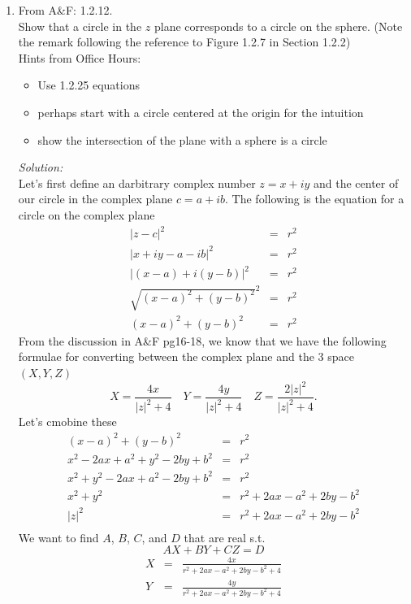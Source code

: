 \documentclass[10pt]{amsart}
\theoremstyle{nonumberplain}
\begin{document}
\mline
\begin{enumerate}[label={\bf {\arabic*}:}]
\item From A\&F: 1.2.12. \\
Show that a circle in the $z$ plane corresponds to a circle on the sphere.
(Note the remark following the reference to Figure 1.2.7 in Section 1.2.2)\\
Hints from Office Hours: \\
\begin{itemize}
\item Use 1.2.25 equations
\item perhaps start with a circle centered at the origin for the intuition
\item show the intersection of the plane with a sphere is a circle \\
\end{itemize}
\textit{Solution:} \\
Let's first define an darbitrary complex number $z = x + iy$ and the center of our circle in the complex plane $c = a + ib$.
The following is the equation for a circle on the complex plane
\begin{eqnarray*}
|z - c|^2 &=& r^2 \\
|x + iy - a - ib|^2 &=& r^2 \\
|(x - a) + i(y -b)|^2 &=& r^2 \\
\sqrt{(x - a)^2 + (y - b)^2}^2 &=& r^2 \\
(x - a)^2 + (y - b)^2 &=& r^2
\end{eqnarray*}
From the discussion in A\&F pg16-18, we know that we have the following formulae for converting between the complex plane and the 3 space $(X, Y, Z)$
$$X = \frac{4x}{|z|^2 + 4} \quad Y = \frac{4y}{|z|^2 + 4} \quad Z = \frac{2|z|^2}{|z|^2 + 4}.$$
Let's cmobine these
\begin{eqnarray*}
(x - a)^2 + (y - b)^2 &=& r^2 \\
x^2 -2ax + a^2 + y^2 -2by + b^2 &=& r^2 \\
x^2 + y^2 -2ax + a^2 -2by + b^2 &=& r^2 \\
x^2 + y^2 &=& r^2 +2ax - a^2 +2by - b^2 \\
|z|^2 &=& r^2 +2ax - a^2 +2by - b^2 \\
\end{eqnarray*}
We want to find $A$, $B$, $C$, and $D$ that are real s.t. $$AX + BY + CZ = D$$
\begin{eqnarray*}
X &=& \frac{4x}{r^2 +2ax - a^2 +2by - b^2 + 4} \\
Y &=& \frac{4y}{r^2 +2ax - a^2 +2by - b^2 + 4} \\

\end{eqnarray*}
\end{enumerate}
\end{document}
